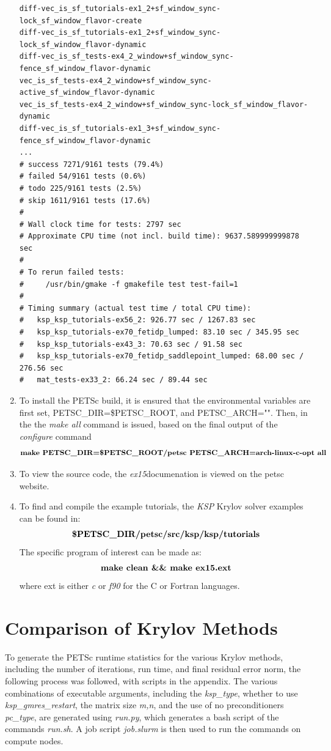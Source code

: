 \documentclass[12pt,letterpaper]{article}
\newcommand{\exe}{PETSc }
\newcommand{\cmd}[1]{$$\textrm{\textbf{#1}}$$}
\newcommand{\program}{\textit{ex15}}
\newcommand{\programreg}{ex15}
\begin{document}
\begin{enumerate}
\begin{verbatim}
diff-vec_is_sf_tutorials-ex1_2+sf_window_sync-lock_sf_window_flavor-create 
diff-vec_is_sf_tutorials-ex1_2+sf_window_sync-lock_sf_window_flavor-dynamic 
diff-vec_is_sf_tests-ex4_2_window+sf_window_sync-fence_sf_window_flavor-dynamic
vec_is_sf_tests-ex4_2_window+sf_window_sync-active_sf_window_flavor-dynamic 
vec_is_sf_tests-ex4_2_window+sf_window_sync-lock_sf_window_flavor-dynamic 
diff-vec_is_sf_tutorials-ex1_3+sf_window_sync-fence_sf_window_flavor-dynamic 
... 
# success 7271/9161 tests (79.4%)
# failed 54/9161 tests (0.6%)
# todo 225/9161 tests (2.5%)
# skip 1611/9161 tests (17.6%)
#
# Wall clock time for tests: 2797 sec
# Approximate CPU time (not incl. build time): 9637.589999999878 sec
#
# To rerun failed tests: 
#     /usr/bin/gmake -f gmakefile test test-fail=1
#
# Timing summary (actual test time / total CPU time): 
#   ksp_ksp_tutorials-ex56_2: 926.77 sec / 1267.83 sec
#   ksp_ksp_tutorials-ex70_fetidp_lumped: 83.10 sec / 345.95 sec
#   ksp_ksp_tutorials-ex43_3: 70.63 sec / 91.58 sec
#   ksp_ksp_tutorials-ex70_fetidp_saddlepoint_lumped: 68.00 sec / 276.56 sec
#   mat_tests-ex33_2: 66.24 sec / 89.44 sec
\end{verbatim}
  \item To install the \exe build, it is ensured that the environmental variables are first set, PETSC\_DIR=\$PETSC\_ROOT, and PETSC\_ARCH="". Then, in the the \textit{make all} command is issued, based on the final output of the \textit{configure} command
  \cmd{make PETSC\_DIR=\$PETSC\_ROOT/petsc PETSC\_ARCH=arch-linux-c-opt all}
  \item To view the source code, the \program documenation is viewed on the petsc website.
  \item To find and compile the example tutorials, the \textit{KSP} Krylov solver examples can be found in:
  \cmd{\$PETSC\_DIR/petsc/src/ksp/ksp/tutorials}
  The specific program of interest can be made as:
  \cmd{make clean \&\& make \programreg.ext}
  where ext is either \textit{c} or \textit{f90} for the C or Fortran languages.
\end{enumerate}


\section{Comparison of Krylov Methods}
To generate the \exe runtime statistics for the various Krylov methods, including the number of iterations, run time, and final residual error norm, the following process was followed, with scripts in the appendix.  The various combinations of executable arguments, including the \textit{ksp\_type}, whether to use \textit{ksp\_gmres\_restart}, the matrix size \textit{m,n}, and the use of no preconditioners \textit{pc\_type}, are generated using \textit{run.py}, which generates a bash script of the commands \textit{run.sh}. A job script \textit{job.slurm} is then used to run the commands on compute nodes. 
\end{document}
